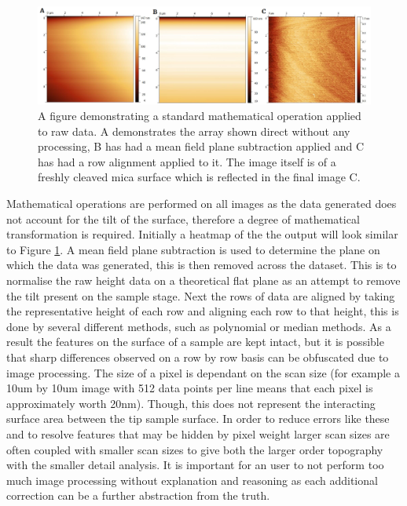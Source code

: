 \begin{figure}[h!]     %
        \begin{center}
          \includegraphics[width=140mm]{chapter2/MathOp.png}
\end{center}
\caption{A figure demonstrating a standard mathematical operation applied to raw data. A demonstrates the array shown direct without any processing, B has had a mean field plane subtraction applied and C has had a row alignment applied to it. The image itself is of a freshly cleaved mica surface which is reflected in the final image C.}
\label{fig:MathOp}                 %
\end{figure}

Mathematical operations are performed on all images as the data generated does not account for the tilt of the surface, therefore a degree of mathematical transformation is required. Initially a heatmap of the the output will look similar to Figure \ref{fig:MathOp}. A mean field plane subtraction is used to determine the plane on which the data was generated, this is then removed across the dataset. This is to normalise the raw height data on a theoretical flat plane as an attempt to remove the tilt present on the sample stage. Next the rows of data are aligned by taking the representative height of each row and aligning each row to that height, this is done by several different methods, such as polynomial or median methods. As a result the features on the surface of a sample are kept intact, but it is possible that sharp differences observed on a row by row basis can be obfuscated due to image processing. The size of a pixel is dependant on the scan size (for example a 10um by 10um image with 512 data points per line means that each pixel is approximately worth 20nm). Though, this does not represent the interacting surface area between the tip sample surface. In order to reduce errors like these and to resolve features that may be hidden by pixel weight larger scan sizes are often coupled with smaller scan sizes to give both the larger order topography with the smaller detail analysis. It is important for an user to not perform too much image processing without explanation and reasoning as each additional correction can be a further abstraction from the truth.

